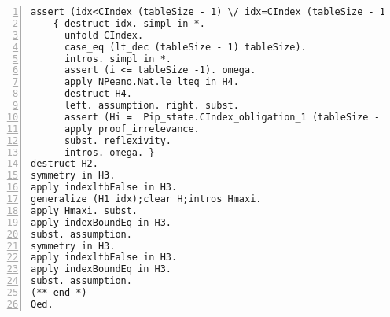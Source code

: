\begin{appendices}
\begin{lstlisting}[xleftmargin=-.1\textwidth,
xrightmargin=-.1\textwidth,
mathescape=true,numbers=left]
assert (idx<CIndex (tableSize - 1) \/ idx=CIndex (tableSize - 1)).
    { destruct idx. simpl in *. 
      unfold CIndex.
      case_eq (lt_dec (tableSize - 1) tableSize).
      intros. simpl in *.
      assert (i <= tableSize -1). omega.
      apply NPeano.Nat.le_lteq in H4.
      destruct H4.
      left. assumption. right. subst.
      assert (Hi =  Pip_state.CIndex_obligation_1 (tableSize - 1) l).
      apply proof_irrelevance.
      subst. reflexivity.
      intros. omega. }
destruct H2.
symmetry in H3.
apply indexltbFalse in H3.
generalize (H1 idx);clear H;intros Hmaxi.
apply Hmaxi. subst.
apply indexBoundEq in H3.
subst. assumption. 
symmetry in H3.
apply indexltbFalse in H3.
apply indexBoundEq in H3.
subst. assumption.
(** end *)
Qed.
\end{lstlisting}


\end{appendices}



